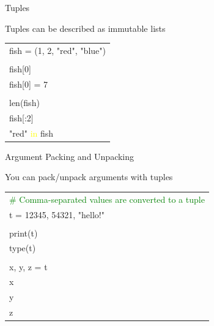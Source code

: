 \documentclass[serif, aspectratio=169]{beamer}
\newcommand{\tgreen}[1]{\textcolor{green}{#1}}
\newcommand{\tyellow}[1]{\textcolor{yellow}{#1}}
\newenvironment{CLI} %
    {
    \noindent
    \ttfamily 
    \footnotesize
    \begin{tcolorbox}[colback=gray!150,colframe=black]
    \color{white}
    \begin{tabular}{p{4.5cm}p{7.5cm}}
    }
    { 
    \end{tabular}
    \end{tcolorbox}
    }
\begin{document}
\begin{frame}{Tuples}
    \begin{block}{Tuples can be described as immutable lists}
        \vspace{2pt}
        \begin{CLI}
            \multicolumn{2}{l}{fish = (1, 2, "red", "blue")} \\
            & \\
            fish[0] & \\%
            fish[0] = 7 & \\%
            & \\
            len(fish) & \\%
            fish[:2] & \\%
            "red" \tyellow{in} fish & \\%
        \end{CLI}
    \end{block}
\end{frame}

\begin{frame}{Argument Packing and Unpacking}
    \begin{block}{You can pack/unpack arguments with tuples}
        \vspace{2pt}
        \begin{CLI}
            \multicolumn{2}{l}{\tgreen{\# Comma-separated values are converted to a tuple}} \\
            \multicolumn{2}{l}{t = 12345, 54321, "hello!"} \\
            & \\
            print(t) & \\%
            type(t) & \\%
            & \\
            x, y, z = t & \\
            x & \\%
            y & \\%
            z & \\%
        \end{CLI}
    \end{block}
\end{frame}
\end{document}
